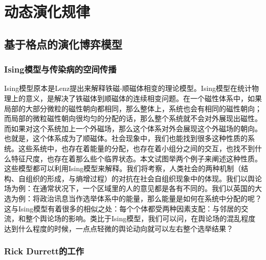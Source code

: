 
\chapter{动态演化规律}

\section{基于格点的演化博弈模型}

\subsection{Ising模型与传染病的空间传播}

Ising模型原本是Lenz提出来解释铁磁-顺磁体相变的理论模型。Ising模型在统计物理上的意义，是解决了铁磁体到顺磁体的连续相变问题。在一个磁性体系中，如果局部的大部分微粒的磁性朝向都相同，那么整体上，系统也会有相同的磁性朝向；而局部的微粒磁性朝向很均匀的分配的话，那么整个系统就不会对外展现出磁性。而如果对这个系统加上一个外磁场，那么这个体系对外会展现这个外磁场的朝向。也就是，这个体系成为了顺磁体。社会现象中，我们也能找到很多这种性质的系统。这些系统中，也存在着能量的分配，也存在着小组分之间的交互，也找不到什么特征尺度，也存在着那么些个临界状态。本文试图举两个例子来阐述这种性质。这些模型都可以利用Ising模型来解释。我们将考察，人类社会的两种机制（结构、自组织的形成，与熵增过程）的对抗在社会自组织现象中的体现。我们以舆论场为例：在通常状况下，一个区域里的人的意见都是各有不同的。我们以英国的大选为例：将政治讯息当作选举体系中的能量，那么能量是如何在系统中分配的呢？这与Ising模型有着很多的相似之处：每个个体都受两种因素支配：与邻居的交流，和整个舆论场的影响。类比于Ising模型，我们可以问，在舆论场的混乱程度达到什么程度的时候，一点点轻微的舆论动向就可以左右整个选举结果？

\subsection{Rick Durrett的工作}